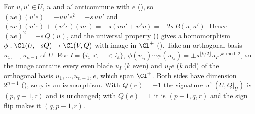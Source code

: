 For $u, u' \in U$, $u$ and $u'$ anticommute with $e$ (), so $(ue)(u'e) = -u u' e^{2} = -s\,u u'$ and $(ue)(u'e) + (u'e)(ue) = -s(uu' + u'u) = -2s\,B(u, u')$. Hence $(ue)^{2} = -s\,Q(u)$, and the universal property () gives a homomorphism $\phi : \Cl(U, -sQ) \to \Cl(V, Q)$ with image in $\Cl^{+}$ (). Take an orthogonal basis $u_1, \dots, u_{n-1}$ of $U$. For $I = \{i_1 < \dots < i_k\}$, $\phi(u_{i_1}) \cdots \phi(u_{i_k}) = \pm s^{\lfloor k/2 \rfloor} u_I e^{k \bmod 2}$, so the image contains every even blade $u_I$ ($k$ even) and $u_I e$ ($k$ odd) of the orthogonal basis $u_1, \dots, u_{n-1}, e$, which span $\Cl^{+}$. Both sides have dimension $2^{n-1}$ (), so $\phi$ is an isomorphism. With $Q(e) = -1$ the signature of $(U, Q|_U)$ is $(p, q - 1, r)$ and is unchanged; with $Q(e) = 1$ it is $(p - 1, q, r)$ and the sign flip makes it $(q, p - 1, r)$.
